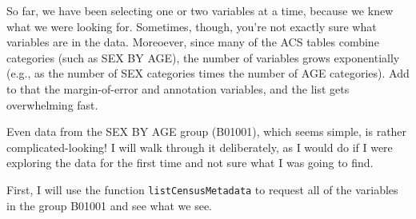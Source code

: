 \documentclass[
  openany]{book}
\newenvironment{Shaded}{\begin{snugshade}}{\end{snugshade}}
\newcommand{\AttributeTok}[1]{\textcolor[rgb]{0.77,0.63,0.00}{#1}}
\newcommand{\CommentTok}[1]{\textcolor[rgb]{0.56,0.35,0.01}{\textit{#1}}}
\newcommand{\DecValTok}[1]{\textcolor[rgb]{0.00,0.00,0.81}{#1}}
\newcommand{\FunctionTok}[1]{\textcolor[rgb]{0.00,0.00,0.00}{#1}}
\newcommand{\NormalTok}[1]{#1}
\newcommand{\OtherTok}[1]{\textcolor[rgb]{0.56,0.35,0.01}{#1}}
\newcommand{\SpecialCharTok}[1]{\textcolor[rgb]{0.00,0.00,0.00}{#1}}
\newcommand{\StringTok}[1]{\textcolor[rgb]{0.31,0.60,0.02}{#1}}
\begin{document}
So far, we have been selecting one or two variables at a time, because we knew what we were looking for. Sometimes, though, you're not exactly sure what variables are in the data. Moreoever, since many of the ACS tables combine categories (such as SEX BY AGE), the number of variables grows exponentially (e.g., as the number of SEX categories times the number of AGE categories). Add to that the margin-of-error and annotation variables, and the list gets overwhelming fast.

Even data from the SEX BY AGE group (B01001), which seems simple, is rather complicated-looking! I will walk through it deliberately, as I would do if I were exploring the data for the first time and not sure what I was going to find.

First, I will use the function \texttt{listCensusMetadata} to request all of the variables in the group B01001 and see what we see.

\begin{Shaded}
\end{Shaded}
\end{document}
